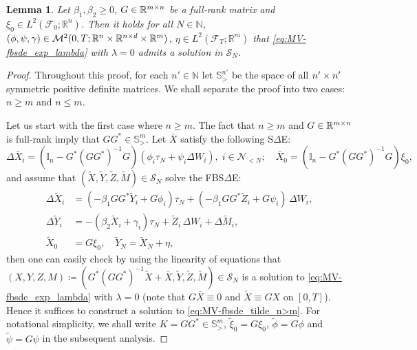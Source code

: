 \documentclass[11pt]{article}
\numberwithin{equation}{section}
\newtheorem{Lemma}[Theorem]{Lemma}
\theoremstyle{definition}
\theoremstyle{remark}
\newcommand{\q}{\quad}   \newcommand{\qq}{\qquad}
\def\l{\label}  \def\f{\frac}  \def\fa{\forall}
\def\b{\beta}  \def\a{\alpha} \def\ga{\gamma}
\def\cF{\mathcal{F}}
\def\cM{\mathcal{M}}
\def\cN{\mathcal{N}}
\def\cS{\mathcal{S}}
\def\sI{{\mathbb{I}}}
\def\sN{{\mathbb{N}}}
\def\sR{{\mathbb R}}
\def\sS{{\mathbb{S}}}
\begin{document}
\begin{Lemma}\l{lem:linear_existence}
Let $\b_1,\b_2\ge 0$, $G\in \sR^{m\t n}$ be a full-rank matrix
and 
  $\xi_0\in L^2(\cF_0;\sR^n)$.
Then  it holds for all  $N\in \sN$,
$(\phi,\psi,\gamma)\in \cM^2(0,T; \sR^n\t \sR^{n\t d}\t \sR^m)$, 
 $\eta\in L^2(\cF_T;\sR^m)$
  that 
 \eqref{eq:MV-fbsde_exp_lambda} with $\lambda=0$ admits a solution in $\cS_N$.
\end{Lemma}

\begin{proof}
Throughout this proof, 
for each $n'\in\sN$
let $\sS^{n'}_>$ be the space of all ${n'}\times {n'}$ symmetric positive definite matrices.
We shall separate the proof  into  two cases: $n \ge m$ and $n\le m$.

Let us start with the first case where $n\ge m$.
The fact that $n\ge m$ and  $G\in \sR^{m\t n}$ is full-rank imply that $GG^*\in \sS^m_>$.
Let
 $\bar{X}$ satisfy the following  S$\Delta$E:
$$
\Delta \bar{X}_i=(\sI_n-G^*(GG^*)^{-1}G)(\phi_{i}\tau_N+\psi_i\Delta W_i), \; i\in \cN_{<N}; 
\q \bar{X}_0=(\sI_n-G^*(GG^*)^{-1}G)\xi_0,
$$
and assume that $(\tilde{X},\tilde{Y},\tilde{Z},\tilde{M})\in \cS_N$
 solve the FBS$\Delta$E:
\begin{subequations}\label{eq:MV-fbsde_tilde_n>m}
\begin{align}
\Delta \tilde{X}_i&=(-\b_1 GG^*\tilde{Y}_{i}+G\phi_{i})\tau_N  +(-\b_1 GG^*\tilde{Z}_i+G\psi_i)\, \Delta W_i, 
\l{eq:fbsde_fwd_tilde_n>m}\\
\Delta \tilde{Y}_i&=-(\b_2\tilde{X}_i+\gamma_i)\tau_N+\tilde{Z}_i\,\Delta W_i+\Delta \tilde{M}_i,
\l{eq:fbsde_bwd_tilde_n>m}\\
\tilde{X}_0&=G\xi_0,\q \tilde{Y}_N=\tilde{X}_N+\eta,
\l{eq:fbsde_terminal_tilde_n>m}
\end{align}
\end{subequations}
then 
 one can easily check
by using the linearity of  equations
 that 
$(X,Y, Z, M)\coloneqq (G^*(GG^*)^{-1}\tilde{X}+\bar{X},\tilde{Y},\tilde{Z},\tilde{M})\in \cS_N$ is a solution to 
\eqref{eq:MV-fbsde_exp_lambda} with $\lambda=0$
(note that $G\bar{X}\equiv 0$
and $ \tilde{X}\equiv GX$ on $[0,T]$).
Hence it suffices to construct a solution to \eqref{eq:MV-fbsde_tilde_n>m}.
For notational simplicity, we shall write $K=GG^*\in \sS^m_>$, $\tilde{\xi}_0=G\xi_0$, $\tilde{\phi}=G\phi$ and $\tilde{\psi}=G\psi$ in the subsequent analysis.



\end{proof}
\end{document}
